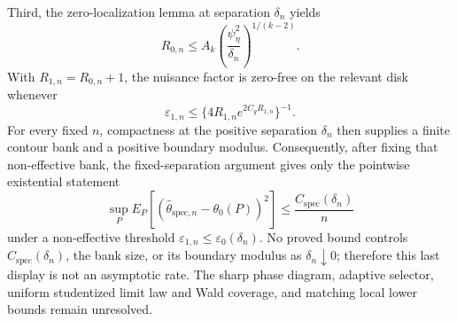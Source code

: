 Third, the zero-localization lemma at separation \(\delta_n\) yields
\[
 R_{0,n}\le
 A_k\left(\frac{\psi_{\eta}^2}{\delta_n}\right)^{1/(k-2)}.
\]
With \(R_{1,n}=R_{0,n}+1\), the nuisance factor is zero-free on the relevant disk whenever
\[
 \varepsilon_{1,n}\le
 \{4R_{1,n}e^{2C_gR_{1,n}}\}^{-1}.
\]
For every fixed \(n\), compactness at the positive separation \(\delta_n\) then supplies a finite contour bank and a positive boundary modulus. Consequently, after fixing that non-effective bank, the fixed-separation argument gives only the pointwise existential statement
\[
 \sup_P E_P[(\widehat\theta_{\mathrm{spec},n}-\theta_0(P))^2]
 \le \frac{C_{\mathrm{spec}}(\delta_n)}{n}
\]
under a non-effective threshold \(\varepsilon_{1,n}\le\varepsilon_0(\delta_n)\). No proved bound controls \(C_{\mathrm{spec}}(\delta_n)\), the bank size, or its boundary modulus as \(\delta_n\downarrow0\); therefore this last display is not an asymptotic rate. The sharp phase diagram, adaptive selector, uniform studentized limit law and Wald coverage, and matching local lower bounds remain unresolved.
